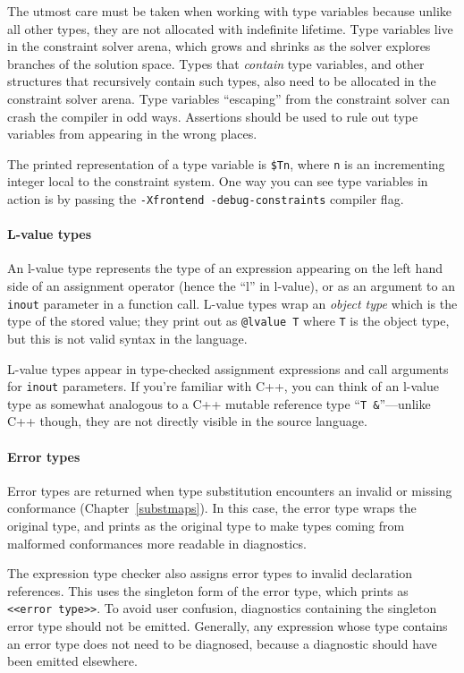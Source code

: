 \documentclass[a4paper,headsepline,bibliography=totoc,toc=flat,fleqn,twoside=semi]{scrbook}
\theoremstyle{definition}
\theoremstyle{definition}
\theoremstyle{definition}
\begin{document}
The utmost care must be taken when working with type variables because unlike all other types, they are not allocated with indefinite lifetime. Type variables live in the constraint solver arena, which grows and shrinks as the solver explores branches of the solution space. Types that \emph{contain} type variables, and other structures that recursively contain such types, also need to be allocated in the constraint solver arena. Type variables ``escaping'' from the constraint solver can crash the compiler in odd ways. Assertions should be used to rule out type variables from appearing in the wrong places.

The printed representation of a type variable is \texttt{\$Tn}, where \texttt{n} is an incrementing integer local to the constraint system. One way you can see type variables in action is by passing the \texttt{-Xfrontend~-debug-constraints} compiler flag.

\paragraph{L-value types}
An l-value type represents the type of an expression appearing on the left hand side of an assignment operator (hence the ``l'' in l-value), or as an argument to an \texttt{inout} parameter in a function call. L-value types wrap an \emph{object type} which is the type of the stored value; they print out as \texttt{@lvalue~T} where \texttt{T} is the object type, but this is not valid syntax in the language.

L-value types appear in type-checked assignment expressions and call arguments for \texttt{inout} parameters. If you're familiar with C++, you can think of an l-value type as somewhat analogous to a C++ mutable reference type ``\texttt{T \&}''---unlike C++ though, they are not directly visible in the source language. 

\paragraph{Error types}
Error types are returned when type substitution encounters an invalid or missing conformance (Chapter~\ref{substmaps}). In this case, the error type wraps the original type, and prints as the original type to make types coming from malformed conformances more readable in diagnostics.

The expression type checker also assigns error types to invalid declaration references. This uses the singleton form of the error type, which prints as \texttt{<<error~type>>}. To avoid user confusion, diagnostics containing the singleton error type should not be emitted. Generally, any expression whose type contains an error type does not need to be diagnosed, because a diagnostic should have been emitted elsewhere.
\end{document}
